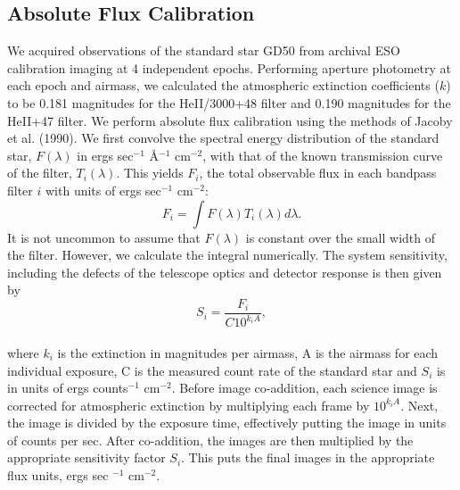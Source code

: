 \documentclass[twocolumn]{aastex61}
\begin{document}
\subsection{Absolute Flux Calibration}
We acquired observations of the standard star GD50 from archival ESO calibration imaging at 4 independent epochs. Performing aperture photometry at each epoch and airmass, we calculated the atmospheric extinction coefficients ($k$) to be 0.181 magnitudes for the HeII/3000+48 filter and 0.190 magnitudes for the HeII+47 filter. We perform absolute flux calibration using the methods of Jacoby et al. (1990). We first convolve the spectral energy distribution of the standard star, $F(\lambda)$ in ergs sec$^{-1}$ \AA$^{-1}$ cm$^{-2}$, with that of the known transmission curve of the filter, $T_{i}(\lambda)$. This yields $F_i$, the total observable flux in each bandpass filter $i$ with units of ergs sec$^{-1}$ cm$^{-2}$:
\begin{equation*}
F_{i}=\int F(\lambda)T_{i}(\lambda)d\lambda.
\end{equation*}
It is not uncommon to assume that $F(\lambda)$ is constant over the small width of the filter. 
However, we calculate the integral numerically.
The system sensitivity, including the defects of the telescope optics and detector response is then given by
\begin{equation*}
S_{i}=\dfrac{F_{i}}{C10^{k_{i}A}},
\end{equation*}\\
where $k_i$ is the extinction in magnitudes per airmass, A is the airmass for each individual exposure, C is the measured count rate of the standard star and $S_i$ is in units of ergs counts$^{-1}$ cm$^{-2}$. Before image co-addition, each science image is corrected for atmospheric extinction by multiplying each frame by $10^{k_{i}A}$. Next, the image is divided by the exposure time, effectively putting the image in units of counts per sec. After co-addition, the images are then multiplied by the appropriate sensitivity factor $S_{i}$. This puts the final images in the appropriate flux units, ergs sec $^{-1}$ cm$^{-2}$.
\end{document}
